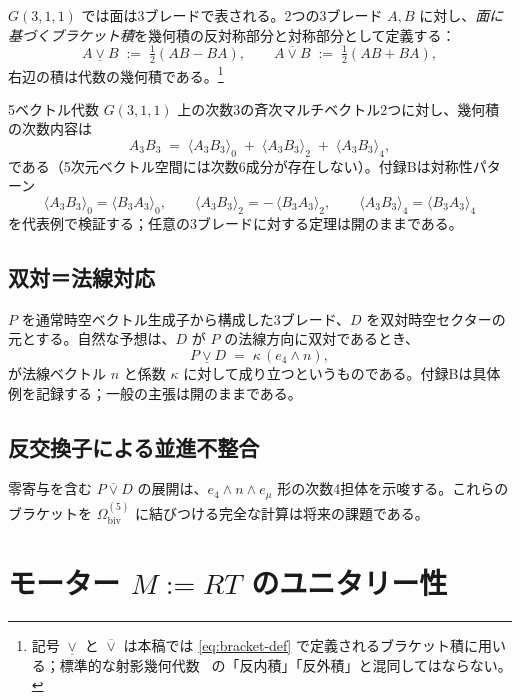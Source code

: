 \documentclass[dvipdfmx,11pt,a4paper]{article}
\theoremstyle{definition}
\theoremstyle{plain}
\theoremstyle{remark}
\begin{document}
$G(3,1,1)$ では面は3ブレードで表される。2つの3ブレード $A,B$ に対し、\emph{面に基づくブラケット積}を幾何積の反対称部分と対称部分として定義する：
\begin{equation}
A \mathbin{\underline{\vee}} B \;:=\; \tfrac{1}{2}(AB - BA),
\qquad
A \mathbin{\overline{\vee}} B \;:=\; \tfrac{1}{2}(AB + BA),
\label{eq:bracket-def}
\end{equation}
右辺の積は代数の幾何積である。\footnote{記号 $\underline{\vee}$ と $\overline{\vee}$ は本稿では \eqref{eq:bracket-def} で定義されるブラケット積に用いる；標準的な射影幾何代数~\cite{Lengyel2024,DorstFontijneMann2007} の「反内積」「反外積」と混同してはならない。}

5ベクトル代数 $G(3,1,1)$ 上の次数3の斉次マルチベクトル2つに対し、幾何積の次数内容は
\[
A_{3}B_{3} \;=\; \langle A_{3}B_{3}\rangle_{0} \;+\; \langle A_{3}B_{3}\rangle_{2} \;+\; \langle A_{3}B_{3}\rangle_{4},
\]
である（5次元ベクトル空間には次数6成分が存在しない）。付録Bは対称性パターン
\[
\langle A_{3}B_{3}\rangle_{0} = \langle B_{3}A_{3}\rangle_{0},
\qquad
\langle A_{3}B_{3}\rangle_{2} = -\,\langle B_{3}A_{3}\rangle_{2},
\qquad
\langle A_{3}B_{3}\rangle_{4} = \langle B_{3}A_{3}\rangle_{4}
\]
を代表例で検証する；任意の3ブレードに対する定理は開のままである。

\subsection{双対＝法線対応}

$P$ を通常時空ベクトル生成子から構成した3ブレード、$D$ を双対時空セクターの元とする。自然な予想は、$D$ が $P$ の法線方向に双対であるとき、
\begin{equation}
P \mathbin{\underline{\vee}} D \;=\; \kappa \, (e_{4}\wedge n),
\label{eq:normal-correspondence}
\end{equation}
が法線ベクトル $n$ と係数 $\kappa$ に対して成り立つというものである。付録Bは具体例を記録する；一般の主張は開のままである。

\subsection{反交換子による並進不整合}

零寄与を含む $P\mathbin{\overline{\vee}}D$ の展開は、$e_{4}\wedge n\wedge e_{\mu}$ 形の次数4担体を示唆する。これらのブラケットを $\Omega_{\text{biv}}^{(5)}$ に結びつける完全な計算は将来の課題である。

\section{モーター $M:=RT$ のユニタリー性}
\end{document}
